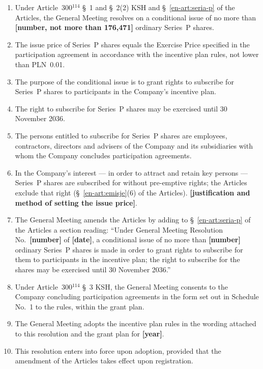 \documentclass[11pt,a4paper]{report}
\newcommand{\field}[1]{\textbf{[#1]}}
\newcommand{\US}[1]{\S~#1 of the Articles}
\begin{document}
\begin{enumerate}
  \item Under Article~300$^{114}$ \S~1 and \S~2(2) KSH and \US{\ref{en-art:seria-p}}, the General Meeting resolves on a conditional issue of no more than \field{number, not more than 176,471} ordinary Series~P shares.
  \item The issue price of Series~P shares equals the Exercise Price specified in the participation agreement in accordance with the incentive plan rules, not lower than PLN~0.01.
  \item The purpose of the conditional issue is to grant rights to subscribe for Series~P shares to participants in the Company's incentive plan.
  \item The right to subscribe for Series~P shares may be exercised until 30 November 2036.
  \item The persons entitled to subscribe for Series~P shares are employees, contractors, directors and advisers of the Company and its subsidiaries with whom the Company concludes participation agreements.
  \item In the Company's interest --- in order to attract and retain key persons --- Series~P shares are subscribed for without pre-emptive rights; the Articles exclude that right (\US{\ref{en-art:emisje}(6)}). \field{justification and method of setting the issue price}.
  \item The General Meeting amends the Articles by adding to \US{\ref{en-art:seria-p}} a section reading: ``Under General Meeting Resolution No.~\field{number} of \field{date}, a conditional issue of no more than \field{number} ordinary Series~P shares is made in order to grant rights to subscribe for them to participants in the incentive plan; the right to subscribe for the shares may be exercised until 30 November 2036.''
  \item Under Article~300$^{114}$ \S~3 KSH, the General Meeting consents to the Company concluding participation agreements in the form set out in Schedule No.~1 to the rules, within the grant plan.
  \item The General Meeting adopts the incentive plan rules in the wording attached to this resolution and the grant plan for \field{year}.
  \item This resolution enters into force upon adoption, provided that the amendment of the Articles takes effect upon registration.
\end{enumerate}
\end{document}
